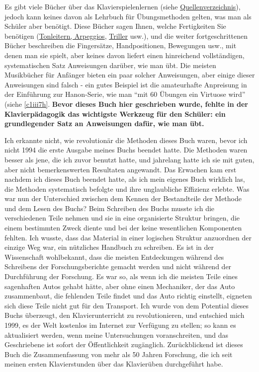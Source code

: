 Es gibt viele Bücher über das Klavierspielenlernen (siehe \hyperref[reference]{Quellenverzeichnis}), jedoch kann keines davon als Lehrbuch für Übungsmethoden gelten, was man als Schüler aber benötigt.
Diese Bücher sagen Ihnen, welche Fertigkeiten Sie benötigen (\hyperref[c1iii5]{Tonleitern, Arpeggios}, \hyperref[c1iii3]{Triller} usw.), und die weiter fortgeschrittenen Bücher beschreiben die Fingersätze, Handpositionen, Bewegungen usw., mit denen man sie spielt, aber keines davon liefert einen hinreichend vollständigen, systematischen Satz Anweisungen darüber, wie man übt.
Die meisten Musikbücher für Anfänger bieten ein paar solcher Anweisungen, aber einige dieser Anweisungen sind falsch - ein gutes Beispiel ist die amateurhafte Anpreisung in der Einführung zur Hanon-Serie, wie man \enquote{mit 60 Übungen ein Virtuose wird} (siehe \hyperref[c1iii7h]{\autoref{c1iii7h}}.
\textbf{Bevor dieses Buch hier geschrieben wurde, fehlte in der Klavierpädagogik das wichtigste Werkzeug für den Schüler: ein grundlegender Satz an Anweisungen dafür, wie man übt.}

Ich erkannte nicht, wie revolutionär die Methoden dieses Buch waren, bevor ich nicht 1994 die erste Ausgabe meines Buchs beendet hatte.
Die Methoden waren besser als jene, die ich zuvor benutzt hatte, und jahrelang hatte ich sie mit guten, aber nicht bemerkenswerten Resultaten angewandt.
Das Erwachen kam erst nachdem ich dieses Buch beendet hatte, als ich mein eigenes Buch wirklich las, die Methoden systematisch befolgte und ihre unglaubliche Effizienz erlebte.
Was war nun der Unterschied zwischen dem Kennen der Bestandteile der Methode und dem Lesen des Buchs?
Beim Schreiben des Buchs musste ich die verschiedenen Teile nehmen und sie in eine organisierte Struktur bringen, die einem bestimmten Zweck diente und bei der keine wesentlichen Komponenten fehlten.
Ich wusste, dass das Material in einer logischen Struktur anzuordnen der einzige Weg war, ein nützliches Handbuch zu schreiben.
Es ist in der Wissenschaft wohlbekannt, dass die meisten Entdeckungen während des Schreibens der Forschungsberichte gemacht werden und nicht während der Durchführung der Forschung.
Es war so, als wenn ich die meisten Teile eines sagenhaften Autos gehabt hätte, aber ohne einen Mechaniker, der das Auto zusammenbaut, die fehlenden Teile findet und das Auto richtig einstellt, eigneten sich diese Teile nicht gut für den Transport.
Ich wurde von dem Potential dieses Buchs überzeugt, den Klavierunterricht zu revolutionieren, und entschied mich 1999, es der Welt kostenlos im Internet zur Verfügung zu stellen;
so kann es aktualisiert werden, wenn meine Untersuchungen voranschreiten, und das Geschriebene ist sofort der Öffentlichkeit zugänglich.
Zurückblickend ist dieses Buch die Zusammenfassung von mehr als 50 Jahren Forschung, die ich seit meinen ersten Klavierstunden über das Klavierüben durchgeführt habe.

